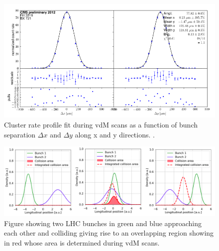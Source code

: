 \begin{figure}[H]
  \centering
  \includegraphics[width=0.7\columnwidth]{./vdm_ratefit.png}
  \caption{ \onehalfspacing Cluster rate profile fit during vdM scans as a function of bunch separation $\Delta x$ and $\Delta y$ along x and y directions. \cite{CMS-PAS-LUM-15-001}.}
  \label{fig:CMS}
\end{figure}


\begin{figure}[H]
  \centering
  \includegraphics[width=\columnwidth]{./vdm_image.png}
  \caption{\onehalfspacing Figure showing two LHC bunches in green and blue approaching each other and colliding giving rise to an overlapping region showing in red whose area is determined during vdM scans.}
  \label{fig:CMS}
\end{figure}






